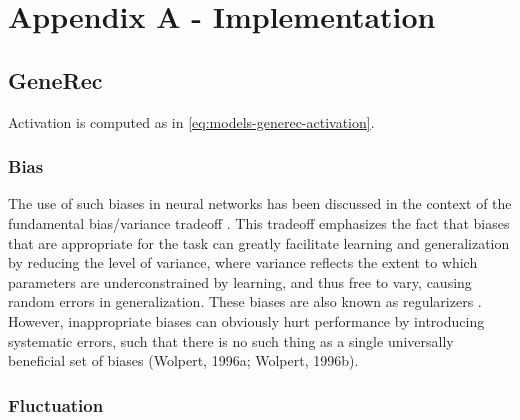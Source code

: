 
\section*{Appendix A - Implementation}
\appendix
{}
\label{sec:appendix-impl} 



\subsection{GeneRec} 
\label{sec:appendix-impl-generec} 

Activation is computed as in \ref{eq:models-generec-activation}.

\subsubsection{Bias} 
The use of such biases in neural networks has been discussed in the context of the fundamental bias/variance tradeoff \citet{geman1992neural}. This tradeoff emphasizes the fact that biases that are appropriate for the task can greatly facilitate learning and generalization by reducing the level of variance, where variance reflects the extent to which parameters are underconstrained by learning, and thus free to vary, causing random errors in generalization. These biases are also known as regularizers \citet{poggio1990networks}. However, inappropriate biases can obviously hurt performance by introducing systematic errors, such that there is no such thing as a single universally beneficial set of biases (Wolpert, 1996a; Wolpert, 1996b). 

\subsubsection{Fluctuation} 
\label{sec:generec-fluctuation}

